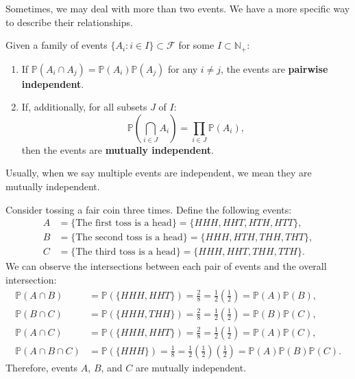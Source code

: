 \documentclass{huhtakm-template-book-v2}
\newcommand{\prob}{\mathbb{P}}
\begin{document}
    Sometimes, we may deal with more than two events. We have a more specific way to describe their relationships.
    \begin{defn}
        Given a family of events $\{A_{i}:i \in I\}\subset\mathcal{F}$ for some $I\subset\mathbb{N}_{+}$:
        \begin{enumerate}
            \item If $\prob(A_{i}\cap A_{j}) = \prob(A_{i})\prob(A_{j})$ for any $i \neq j$, the events are \textbf{pairwise independent}.
            \item If, additionally, for all subsets $J$ of $I$:
            \begin{equation*}
                \prob\left(\bigcap_{i \in J}A_{i}\right) = \prod_{i \in J}\prob(A_{i}),
            \end{equation*}
            then the events are \textbf{mutually independent}.
        \end{enumerate}
    \end{defn}
    \begin{rem}
        Usually, when we say multiple events are independent, we mean they are mutually independent.
    \end{rem}
    \begin{eg}
        Consider tossing a fair coin three times. Define the following events:
        \begin{align*}
            A &= \{\text{The first toss is a head}\} = \{HHH,HHT,HTH,HTT\},\\
            B &= \{\text{The second toss is a head}\} = \{HHH,HTH,THH,THT\},\\
            C &= \{\text{The third toss is a head}\} = \{HHH,HHT,THH,TTH\}.
        \end{align*}
        We can observe the intersections between each pair of events and the overall intersection:
        \begin{align*}
            \prob(A\cap B) &= \prob(\{HHH, HHT\}) = \frac{2}{8} = \frac{1}{2}\left(\frac{1}{2}\right) = \prob(A)\prob(B),\\
            \prob(B\cap C) &= \prob(\{HHH, THH\}) = \frac{2}{8} = \frac{1}{2}\left(\frac{1}{2}\right) = \prob(B)\prob(C),\\
            \prob(A\cap C) &= \prob(\{HHH, HHT\}) = \frac{2}{8} = \frac{1}{2}\left(\frac{1}{2}\right) = \prob(A)\prob(C),\\
            \prob(A\cap B\cap C) &= \prob(\{HHH\}) = \frac{1}{8} = \frac{1}{2}\left(\frac{1}{2}\right)\left(\frac{1}{2}\right) = \prob(A)\prob(B)\prob(C).
        \end{align*}
        Therefore, events $A$, $B$, and $C$ are mutually independent.
    \end{eg}
\end{document}
